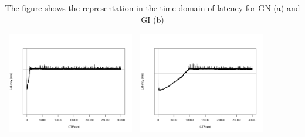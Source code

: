 \begin{table}[htbp]
{\begin{tabular}{l | ccccc}
\begin{minipage}{.15\textwidth}
				\vspace{2pt}
     			 	\includegraphics[width=\linewidth]{images/lat-log-graph/I14}
    				 \end{minipage}
    			   &	 \begin{minipage}{.15\textwidth}
     			 	
				\vspace{2pt}
     			 	\includegraphics[width=\linewidth]{images/lat-log-graph/I15}
    				 \end{minipage}\\
		\hline %
	 \end{tabular}
	}
	\caption[\textsc{Analyser} Investigation Stack - Level 2 - Pattern Identification - Latency - Baselines GN and GI]{The figure shows the  representation in the time domain of latency for GN (a) and GI (b)} 
 	\label{tab:level2-latency-graph}
\end{table}